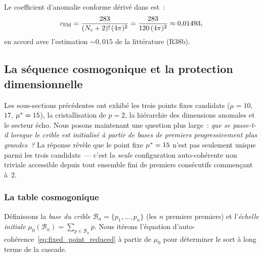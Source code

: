 \documentclass[12pt,a4paper]{article}
\begin{document}
Le coefficient d'anomalie conforme dérivé dans
\cite{companion_physics} est~:
\begin{equation}
  c_{\rm SM} = \frac{283}{(N_c+2)!\,(4\pi)^2} = \frac{283}{120\,(4\pi)^2}
  \approx 0{,}01493,
  \label{eq:c_SM_preview}
\end{equation}
en accord avec l'estimation $\sim 0{,}015$ de la littérature (R38b).

\subsection{La séquence cosmogonique et la protection dimensionnelle}
\label{sec:ch8_cosmogonic_sequence}

Les sous-sections précédentes ont exhibé les trois points fixes
candidats ($\mu = 10$, $17$, ${\mu^{*}} = 15$), la cristallisation de
$p = 2$, la hiérarchie des dimensions anomales et le secteur écho.
Nous posons maintenant une question plus large~: \emph{que se
passe-t-il lorsque le crible est initialisé à partir de bases de
premiers progressivement plus grandes~?} La réponse révèle que le
point fixe ${\mu^{*}} = 15$ n'est pas seulement unique parmi les
trois candidats~--- c'est la \emph{seule} configuration auto-cohérente
non triviale accessible depuis tout ensemble fini de premiers
consécutifs commençant à~$2$.

\subsubsection{La table cosmogonique}

Définissons la \emph{base du crible} $\mathcal{B}_n = \{p_1, \ldots, p_n\}$
(les $n$ premiers premiers) et l'\emph{échelle initiale}
$\mu_0(\mathcal{B}_n) = \sum_{p \in \mathcal{B}_n} p$. Nous itérons
l'équation d'auto-cohérence~\eqref{eq:fixed_point_reduced} à partir
de $\mu_0$ pour déterminer le sort à long terme de la cascade.
\end{document}
